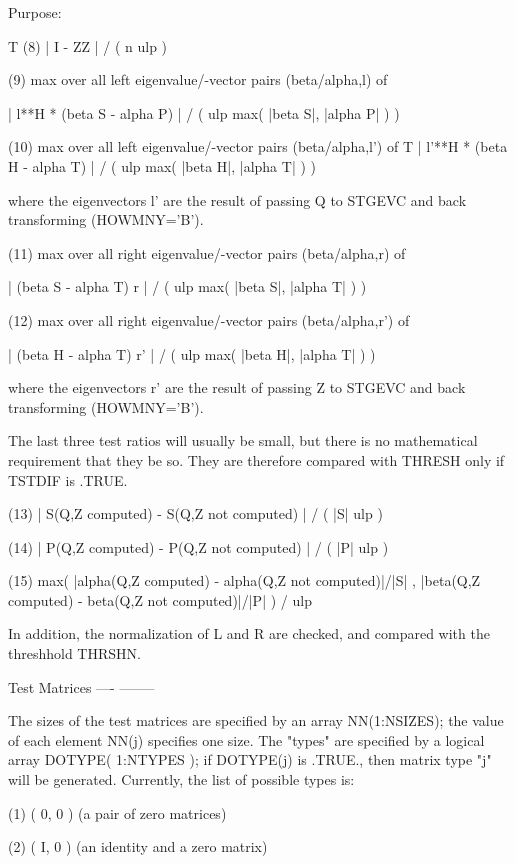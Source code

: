 \begin{DoxyParagraph}{Purpose\+: }
\begin{DoxyVerb}
               T
 (8)   | I - ZZ  | / ( n ulp )

 (9)   max over all left eigenvalue/-vector pairs (beta/alpha,l) of

    | l**H * (beta S - alpha P) | / ( ulp max( |beta S|, |alpha P| ) )

 (10)  max over all left eigenvalue/-vector pairs (beta/alpha,l') of
                           T
   | l'**H * (beta H - alpha T) | / ( ulp max( |beta H|, |alpha T| ) )

       where the eigenvectors l' are the result of passing Q to
       STGEVC and back transforming (HOWMNY='B').

 (11)  max over all right eigenvalue/-vector pairs (beta/alpha,r) of

       | (beta S - alpha T) r | / ( ulp max( |beta S|, |alpha T| ) )

 (12)  max over all right eigenvalue/-vector pairs (beta/alpha,r') of

       | (beta H - alpha T) r' | / ( ulp max( |beta H|, |alpha T| ) )

       where the eigenvectors r' are the result of passing Z to
       STGEVC and back transforming (HOWMNY='B').

 The last three test ratios will usually be small, but there is no
 mathematical requirement that they be so.  They are therefore
 compared with THRESH only if TSTDIF is .TRUE.

 (13)  | S(Q,Z computed) - S(Q,Z not computed) | / ( |S| ulp )

 (14)  | P(Q,Z computed) - P(Q,Z not computed) | / ( |P| ulp )

 (15)  max( |alpha(Q,Z computed) - alpha(Q,Z not computed)|/|S| ,
            |beta(Q,Z computed) - beta(Q,Z not computed)|/|P| ) / ulp

 In addition, the normalization of L and R are checked, and compared
 with the threshhold THRSHN.

 Test Matrices
 ---- --------

 The sizes of the test matrices are specified by an array
 NN(1:NSIZES); the value of each element NN(j) specifies one size.
 The "types" are specified by a logical array DOTYPE( 1:NTYPES ); if
 DOTYPE(j) is .TRUE., then matrix type "j" will be generated.
 Currently, the list of possible types is:

 (1)  ( 0, 0 )         (a pair of zero matrices)

 (2)  ( I, 0 )         (an identity and a zero matrix)


\end{DoxyVerb}
\end{DoxyParagraph}
